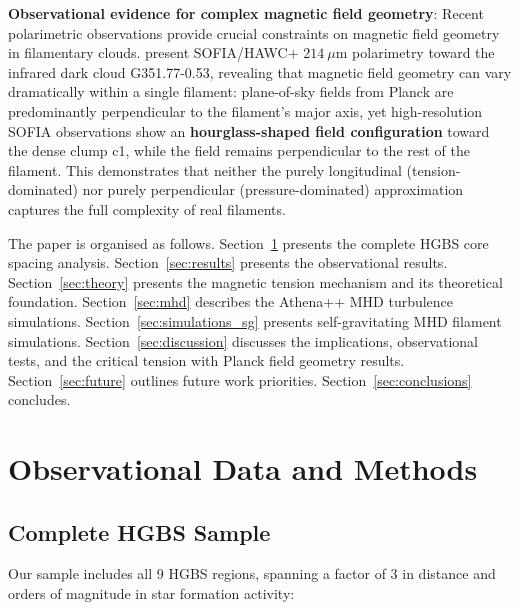 \documentclass[11pt,a4paper]{article}
\begin{document}
\textbf{Observational evidence for complex magnetic field geometry}: Recent polarimetric observations provide crucial constraints on magnetic field geometry in filamentary clouds. \citet{Jadhav2026} present SOFIA/HAWC+ $214~\mu$m polarimetry toward the infrared dark cloud G351.77-0.53, revealing that magnetic field geometry can vary dramatically within a single filament: plane-of-sky fields from Planck are predominantly perpendicular to the filament's major axis, yet high-resolution SOFIA observations show an \textbf{hourglass-shaped field configuration} toward the dense clump c1, while the field remains perpendicular to the rest of the filament. This demonstrates that neither the purely longitudinal (tension-dominated) nor purely perpendicular (pressure-dominated) approximation captures the full complexity of real filaments.

The paper is organised as follows. Section~\ref{sec:observations} presents the complete HGBS core spacing analysis. Section~\ref{sec:results} presents the observational results. Section~\ref{sec:theory} presents the magnetic tension mechanism and its theoretical foundation. Section~\ref{sec:mhd} describes the Athena++ MHD turbulence simulations. Section~\ref{sec:simulations_sg} presents self-gravitating MHD filament simulations. Section~\ref{sec:discussion} discusses the implications, observational tests, and the critical tension with Planck field geometry results. Section~\ref{sec:future} outlines future work priorities. Section~\ref{sec:conclusions} concludes.

\section{Observational Data and Methods}
\label{sec:observations}

\subsection{Complete HGBS Sample}

Our sample includes all 9 HGBS regions, spanning a factor of 3 in distance and orders of magnitude in star formation activity:
\end{document}
